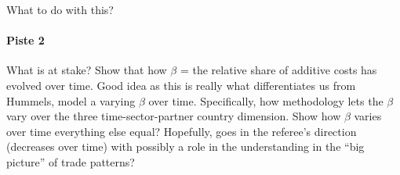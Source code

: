 \documentclass[a4paper,12pt]{article}
\begin{document}
What to do with this?

\paragraph{Piste 2} What is at stake? Show that how $\beta$ = the relative share of additive costs has evolved over time. Good idea as this is really what differentiates us from Hummels, model a varying $\beta$ over time. Specifically, how methodology lets the $\beta$ vary over the three time-sector-partner country dimension. Show how $\beta$ varies over time everything else equal? Hopefully, goes in the referee's direction (decreases over time) with possibly a role in the understanding in the ``big picture'' of trade patterns?
\end{document}

